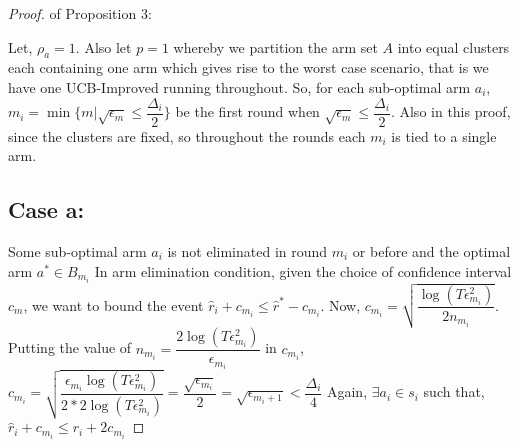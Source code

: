 \begin{proof} of Proposition 3:

Let, $\rho_{a}=1$. Also let $p=1$ whereby we partition the arm set $A$ into equal clusters each containing one arm which gives rise to the worst case scenario, that is we have one UCB-Improved running throughout. So, for each sub-optimal arm $a_{i}$, $m_{i}=\min{\lbrace m|\sqrt{\epsilon_{m}}\leq \dfrac{\Delta_{i}}{2} \rbrace}$ be the first round when $\sqrt{\epsilon_{m}}\leq \dfrac{\Delta_{i}}{2}$. Also in this proof, since the clusters are fixed, so throughout the rounds each $m_{i}$ is tied to a single arm.

\subsection{Case a:} 
Some sub-optimal arm $a_{i}$ is not eliminated in round $m_{i}$ or before and the optimal arm $a^{*}\in B_{m_{i}}$
\newline In arm elimination condition, given the choice of confidence interval $c_{m}$, we want to bound the event $\hat{r}_{i}+c_{m_{i}}\leq \hat{r}^{*}-c_{m_{i}}$. 
\newline Now, $c_{m_{i}}=\sqrt{\dfrac{\log (T\epsilon_{m_{i}}^{2})}{2 n_{m_{i}}}}$.
\newline Putting the value of $n_{m_{i}}=\dfrac{2\log{(T\epsilon_{m_{i}}^{2})}}{\epsilon_{m_{i}}}$ in $c_{m_{i}}$,
\newline $c_{m_{i}}=\sqrt{\dfrac{\epsilon_{m_{i}}\log (T\epsilon_{m_{i}}^{2})}{2*2 \log(T\epsilon_{m_{i}}^{2})}}=\dfrac{\sqrt{\epsilon_{m_{i}}}}{2} = \sqrt{\epsilon_{m_{i}+1}} < \dfrac{\Delta_{i}}{4} $
\newline Again, $\exists a_{i} \in s_{i}$ such that, 
$\hat{r}_{i} + c_{m_{i}}\leq r_{i} + 2c_{m_{i}} $

\end{proof}
